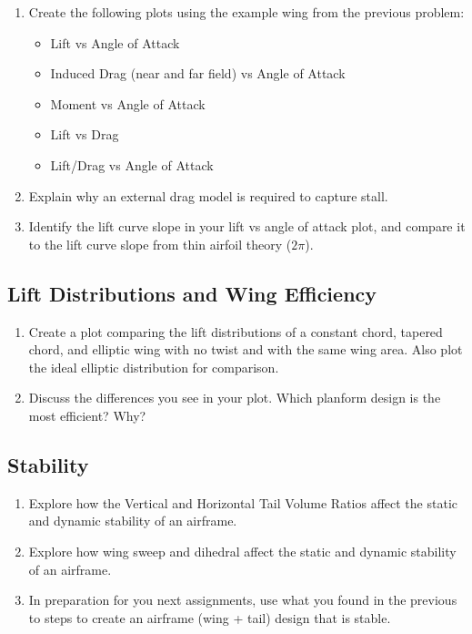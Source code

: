 \documentclass[11pt,twocolumn]{article}
\begin{document}
\begin{enumerate}[label=\roman*.]
	\item Create the following plots using the example wing from the previous problem:
	\begin{itemize}
		\item Lift vs Angle of Attack
		\item Induced Drag (near and far field) vs Angle of Attack
		\item Moment vs Angle of Attack
		\item Lift vs Drag
		\item Lift/Drag vs Angle of Attack
	\end{itemize}
	\item Explain why an external drag model is required to capture stall.
	\item Identify the lift curve slope in your lift vs angle of attack plot, and compare it to the lift curve slope from thin airfoil theory (\(2\pi\)).
\end{enumerate}

\subsection{Lift Distributions and Wing Efficiency}

\begin{enumerate}[label=\roman*.]
	\item Create a plot comparing the lift distributions of a constant chord, tapered chord, and elliptic wing with no twist and with the same wing area.  Also plot the ideal elliptic distribution for comparison.
	\item Discuss the differences you see in your plot.  Which planform design is the most efficient? Why?
\end{enumerate}

\subsection{Stability}

\begin{enumerate}[label=\roman*.]
	\item Explore how the Vertical and Horizontal Tail Volume Ratios affect the static and dynamic stability of an airframe.
	\item Explore how wing sweep and dihedral affect the static and dynamic stability of an airframe.
	\item In preparation for you next assignments, use what you found in the previous to steps to create an airframe (wing + tail) design that is stable.
\end{enumerate}
\end{document}
